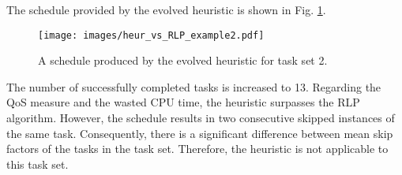 The schedule provided by the evolved heuristic is shown in Fig. \ref{heur_example_2}.
\begin{figure}[ht]
    \centering
    \texttt{[image: images/heur\_vs\_RLP\_example2.pdf]}
    \caption{A schedule produced by the evolved heuristic for task set 2.}
    \label{heur_example_2}
\end{figure}
The number of successfully completed tasks is increased to 13.
Regarding the QoS measure and the wasted CPU time, the heuristic surpasses the RLP algorithm.
However, the schedule results in two consecutive skipped instances of the same task.
Consequently, there is a significant difference between mean skip factors of the tasks in the task set.
Therefore, the heuristic is not applicable to this task set.


